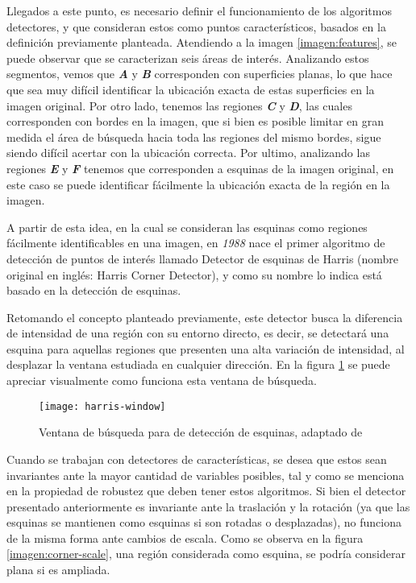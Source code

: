 Llegados a este punto, es necesario definir el funcionamiento de los algoritmos detectores, y que consideran estos como puntos característicos, basados en la definición previamente planteada. Atendiendo a la imagen \ref{imagen:features}, se puede observar que se caracterizan seis áreas de interés. Analizando estos segmentos, vemos que \textbf{\textit{A}} y \textbf{\textit{B}} corresponden con superficies planas, lo que hace que sea muy difícil identificar la ubicación exacta de estas superficies en la imagen original. Por otro lado, tenemos las regiones \textbf{\textit{C}} y \textbf{\textit{D}}, las cuales corresponden con bordes en la imagen, que si bien es posible limitar en gran medida el área de búsqueda hacia toda las regiones del mismo bordes, sigue siendo difícil acertar con la ubicación correcta. Por ultimo, analizando las regiones \textbf{\textit{E}} y \textbf{\textit{F}} tenemos que corresponden a esquinas de la imagen original, en este caso se puede identificar fácilmente la ubicación exacta de la región en la imagen.

A partir de esta idea, en la cual se consideran las esquinas como regiones fácilmente identificables en una imagen, en \textit{1988} nace el primer algoritmo de detección de puntos de interés llamado Detector de esquinas de Harris \cite{harris} (nombre original en inglés: Harris Corner Detector), y como su nombre lo indica está basado en la detección de esquinas.

Retomando el concepto planteado previamente, este detector busca la diferencia de intensidad de una región con su entorno directo, es decir, se detectará una esquina para aquellas regiones que presenten una alta variación de intensidad, al desplazar la ventana estudiada en cualquier dirección. En la figura \ref{imagen:harris-window} se puede apreciar visualmente como funciona esta ventana de búsqueda.

\begin{figure}[H]
	\centering
	\texttt{[image: harris-window]}
	\caption[Ventana de búsqueda para de detección de esquinas]{Ventana de búsqueda para de detección de esquinas, adaptado de\protect\footnotemark}
	\label{imagen:harris-window}
\end{figure}

Cuando se trabajan con detectores de características, se desea que estos sean invariantes ante la mayor cantidad de variables posibles, tal y como se menciona en la propiedad de robustez que deben tener estos algoritmos. Si bien el detector presentado anteriormente es invariante ante la traslación y la rotación (ya que las esquinas se mantienen como esquinas si son rotadas o desplazadas), no funciona de la misma forma ante cambios de escala. Como se observa en la figura \ref{imagen:corner-scale}, una región considerada como esquina, se podría considerar plana si es ampliada.

